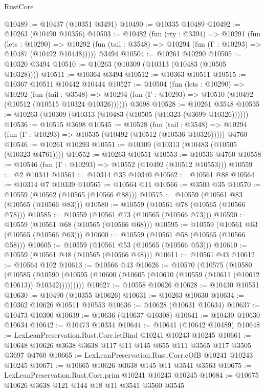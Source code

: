 \begin{lexlean}{RustCore}
\begin{coremodule}
@10489 := @10437 (@10351 @3491)
@10490 := @10335 @10489
@10492 := @10263 (@10490 @10356)
@10503 := @10482
    (fun (rty : @3394) =>
    @10291
      (fun (lets : @10290) =>
      @10292 (fun (tail : @3548) => @10294 (fun (Γ : @10293) => @10487 (@10492 @10448)))))
    @3494
@10504 := @10261 @10290
@10505 := @10320 @3494
@10510 := @10263 (@10309 (@10313 (@10483 (@10505 @10328))))
@10511 := @10364 @3494
@10512 := @10363 @10511
@10515 := @10367 @10511 @10442 @10444
@10527 := @10504
    (fun (lets : @10290) =>
    @10292
      (fun (tail : @3548) =>
      @10294 (fun (Γ : @10293) => @10510 (@10492 (@10512 (@10515 @10324 @10326))))))
    @3698
@10528 := @10261 @3548
@10535 := @10263 (@10309 (@10313 (@10483 (@10505 (@10323 (@3699 @10326))))))
@10536 := @10515 @3698
@10545 := @10528
    (fun (tail : @3548) => @10294 (fun (Γ : @10293) => @10535 (@10492 (@10512 (@10536 @10326)))))
    @4760
@10546 := @10261 @10293
@10551 := @10309 (@10313 (@10483 (@10505 (@10323 @4761))))
@10552 := @10263 @10551
@10553 := @10536 @4760
@10558 := @10546 (fun (Γ : @10293) => @10552 (@10492 (@10512 @10553)))
@10559 := @2 @10341
@10561 := @10314 @35 @10340
@10562 := @10561 @88
@10564 := @10314 @7 @10339
@10565 := @10564 @11
@10566 := @3503 @35
@10570 := @10559 (@10562 (@10565 (@10566 @88)))
@10575 := @10559 (@10561 @83 (@10565 (@10566 @83)))
@10580 := @10559 (@10561 @78 (@10565 (@10566 @78)))
@10585 := @10559 (@10561 @73 (@10565 (@10566 @73)))
@10590 := @10559 (@10561 @68 (@10565 (@10566 @68)))
@10595 := @10559 (@10561 @63 (@10565 (@10566 @63)))
@10600 := @10559 (@10561 @58 (@10565 (@10566 @58)))
@10605 := @10559 (@10561 @53 (@10565 (@10566 @53)))
@10610 := @10559 (@10561 @48 (@10565 (@10566 @48)))
@10611 := @10561 @43
@10612 := @10564 @102
@10613 := @10566 @43
@10626 := @10570
    (@10575
      (@10580
        (@10585
          (@10590 (@10595 (@10600 (@10605 (@10610 (@10559 (@10611 (@10612 @10613)) @10342)))))))))
@10627 := @10558 @10626
@10628 := @10430 @10551
@10630 := @10490 (@10355 @10626)
@10631 := @10263 @10630
@10634 := @10362 @10626 @10511 @10553
@10636 := @10628 (@10631 @10634)
@10637 := @10473 @10300
@10639 := @10636 (@10637 @10308)
@10641 := @10430 @10630 @10634
@10642 := @10473 @10334
@10644 := @10641 (@10642 @10489)
@10648 := LexLeanPreservation.Rust.Corr.letBind @10241 @10243 @10245
@10661 := @10648 @10626 @3638 @3638 @117 @11 @145 @655 @111 @3565 @117 @3505 @3697 @4760
@10665 := LexLeanPreservation.Rust.Corr.eOfB @10241 @10243 @10245
@10671 := @10665 @10626 @3638 @145 @11 @3541 @3563
@10675 := LexLeanPreservation.Rust.Corr.prim @10241 @10243 @10245
@10684 := @10675 @10626 @3638 @121 @144 @18 @11 @3541 @3560 @3545

\end{coremodule}
\end{lexlean}
